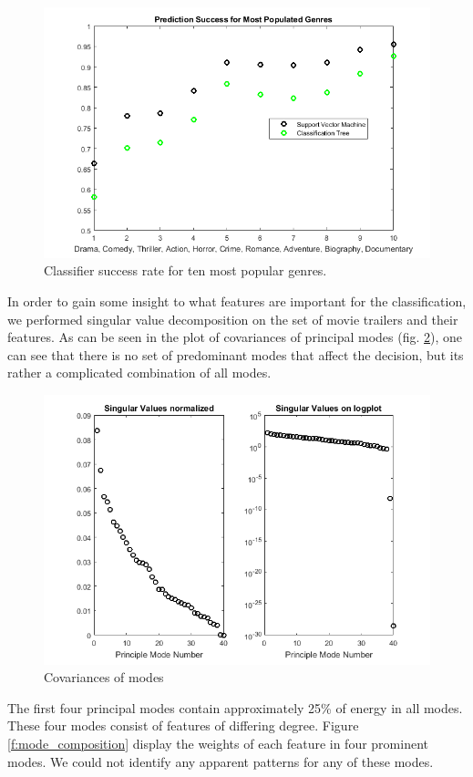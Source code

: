 \documentclass[letterpaper, 10 pt, conference]{ieeeconf}  %
\begin{document}
\begin{figure}[h]
	\centering
	\includegraphics[width=\columnwidth]{TreeVsSVM.png}
	\caption{Classifier success rate for ten most popular genres.}
	\label{f:success_rate}
\end{figure}
In order to gain some insight to what features are important for the classification, we performed singular value decomposition on the set of movie trailers and their features. As can be seen in the plot of covariances of principal modes (fig. \ref{f:mode_covar}), one can see that there is no set of predominant modes that affect the decision, but its rather a complicated combination of all modes.
\begin{figure}[h]
	\centering
	\includegraphics[width=\columnwidth]{singValues.png}
	\caption{Covariances of modes}
	\label{f:mode_covar}
\end{figure}
The first four principal modes contain approximately 25\% of energy in all modes. These four modes consist of features of differing degree. Figure \ref{f:mode_composition} display the weights of each feature in four prominent modes. We could not identify any apparent patterns for any of these modes.
\end{document}
